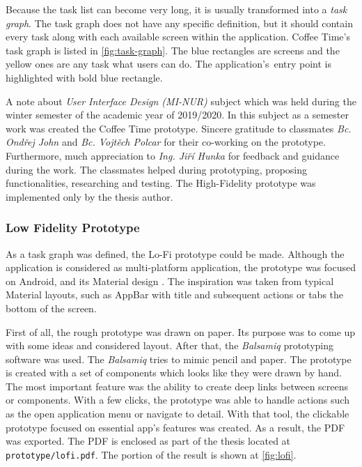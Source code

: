 Because the task list can become very long, it is usually transformed into a \textit{task graph}. The task graph does not have any specific definition, but it should contain every task along with each available screen within the application. Coffee Time's task graph is listed in \cref{fig:task-graph}. The blue rectangles are screens and the yellow ones are any task what users can do. The application's~entry point is highlighted with bold blue rectangle.

A note about \textit{User Interface Design (MI-NUR)} subject which was held during the winter semester of the academic year of 2019/2020. In this subject as a semester work was created the Coffee Time prototype. Sincere gratitude to classmates \textit{Bc. Ondřej John} and \textit{Bc. Vojtěch Polcar} for their co-working on the prototype. Furthermore, much appreciation to \textit{Ing. Jiří Hunka} for feedback and guidance during the work. The classmates helped during prototyping, proposing functionalities, researching and testing. The High-Fidelity prototype was implemented only by the thesis author. 

\subsubsection{Low Fidelity Prototype}
As a task graph was defined, the Lo-Fi prototype could be made. Although the application is considered as multi-platform application, the prototype was focused on Android, and its Material design \cite{material-design}. The inspiration was taken from typical Material layouts, such as AppBar with title and subsequent actions or tabs the bottom of the screen. 

First of all, the rough prototype was drawn on paper. Its purpose was to come up with some ideas and considered layout. After that, the \textit{Balsamiq} \cite{balsamiq} prototyping software was used. The \textit{Balsamiq} tries to mimic pencil and paper. The prototype is created with a set of components which looks like they were drawn by hand.
The most important feature was the ability to create deep links between screens or components. With a few clicks, the prototype was able to handle actions such as the open application menu or navigate to detail. With that tool, the clickable prototype focused on essential app's features was created. As a result, the PDF was exported. The PDF is enclosed as part of the thesis located at \verb|prototype/lofi.pdf|. The portion of the result is shown at \cref{fig:lofi}.

